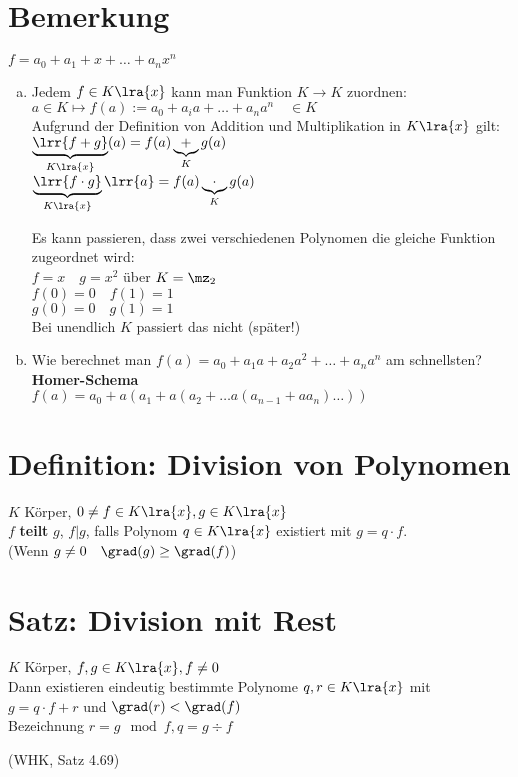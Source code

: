\section{Bemerkung}
	$f=a_0+a_1+x+\dots+a_nx^n$
	\begin{enumerate}[a)]
		\item Jedem $f\in K\lra{x}$ kann man Funktion $K\rightarrow K$ zuordnen:\\
			$a\in K\mapsto f(a):=a_0+a_ia+\dots+a_na^n\quad \in K$\\
			Aufgrund der Definition von Addition und Multiplikation in $K\lra{x}$ gilt:\\
			$\underbrace{\lrr{f+g}}_{K\lra{x}}(a)=f(a)\underbrace{+}_{K}g(a)$\\
			$\underbrace{\lrr{f\cdot g}}_{K\lra{x}}\lrr{a}=f(a)\underbrace{\cdot}_K g(a)$

			Es kann passieren, dass zwei verschiedenen Polynomen die gleiche Funktion zugeordnet wird:\\
			$f=x\quad g=x^2$ über $K=\mz_2$\\
			$f(0)=0\quad f(1)=1$\\
			$g(0)=0\quad g(1)=1$\\
			Bei unendlich $K$ passiert das nicht (später!)
		\item Wie berechnet man $f(a)=a_0+a_1a+a_2a^2+\dots +a_na^n$ am schnellsten?\\
			\textbf{Homer-Schema}\\
			$f(a) = a_0+a(a_1+a(a_2+\dots a(a_{n-1}+aa_n)\dots))$
	\end{enumerate}
\section{Definition: Division von Polynomen}
	$K$ Körper, $0\neq f\in K\lra{x}, g\in K\lra{x}$\\
	$f$ \textbf{teilt} $g$, $f|g$, falls Polynom $q\in K\lra{x}$ existiert mit $g=q\cdot f$.\\
	(Wenn $g\neq 0\quad \grad(g)\geq\grad(f)$)
\section{Satz: Division mit Rest}
	$K$ Körper, $f,g\in K\lra{x}, f\neq 0$\\
	Dann existieren eindeutig bestimmte Polynome $q,r\in K\lra{x}$ mit\\
	$g=q\cdot f+r$ und $\grad(r) <\grad(f)$\\
	Bezeichnung $r=g\mod f, q=g\div f$
	\begin{flushright}
		(WHK, Satz 4.69)
	\end{flushright}
